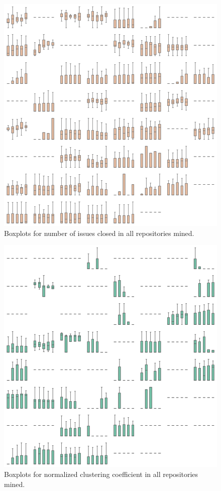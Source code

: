 \begin{appendices}
    \begin{figure}
        \centering
        \includegraphics[width=\textwidth]{figures/quantitative/boxplots/grids/issues_closed.png}
        \caption{Boxplots for number of issues closed  in all repositories mined.}
        \label{app:issues_closed-box-app}
    \end{figure}

    \begin{figure}
        \centering
        \includegraphics[width=\textwidth]{figures/quantitative/boxplots/grids/clustering.png}
        \caption{Boxplots for normalized clustering coefficient in all repositories mined.}
        \label{app:clustering-box-app}
    \end{figure}

\end{appendices}
